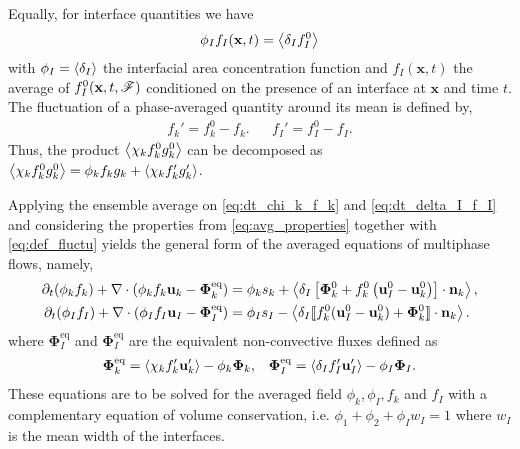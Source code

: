 Equally, for interface quantities we have 
\begin{equation}
    \phi_I f_I (\textbf{x},t) = \left<\delta_I f_I^0\right>
\end{equation}
with $\phi_I = \left<\delta_I\right>$ the interfacial area concentration function and $f_I(\textbf{x},t)$ the average of $f^0_I(\textbf{x},t,\mathscr{F})$ conditioned on the presence of an interface at $\textbf{x}$ and time $t$. 
The fluctuation of a phase-averaged quantity around its mean is defined by,
\begin{align}
    f_k' = f_k^0 - f_k.
    && f_I' = f_I^0 - f_I.
    \label{eq:def_fluctu}
\end{align}
Thus, the product $\left<\chi_k f^0_kg^0_k\right>$ can be decomposed as $\left<\chi_k f_k^0g_k^0\right>=\phi_k f_kg_k + \left<\chi_k f'_kg'_k\right>$. 


Applying the ensemble average on \ref{eq:dt_chi_k_f_k} and \ref{eq:dt_delta_I_f_I} and considering the properties from \ref{eq:avg_properties} together with \ref{eq:def_fluctu} yields the general form of the averaged equations of multiphase flows, namely,
\begin{align}
    \partial_t (\phi_k f_k)
    +\mathbf{\nabla}\cdot (\phi_k f_k \textbf{u}_k - \mathbf{\Phi}_k^\text{eq})
    &= 
    \phi_k s_k
    + \left<\delta_I\left[
        \mathbf{\Phi}_k^0
        + f_k^0
        \left(
            \textbf{u}_I^0
            - \textbf{u}_k^0
        \right)
    \right]
    \cdot \textbf{n}_k\right> ,
    \label{eq:avg_dt_chi_f}\\
    \partial_t (\phi_I f_I)
    +\mathbf{\nabla}\cdot (\phi_I f_I \textbf{u}_I- \mathbf{\Phi}_{I}^\text{eq})
    &= 
    \phi_I s_I
    - \left<\delta_I 
    \llbracket 
    f_k^0 (\textbf{u}_I^0 - \textbf{u}_k^0)
    + \mathbf{\Phi}_k^0
     \rrbracket \cdot \textbf{n}_k 
     \right>.
    \label{eq:avg_dt_delta_f}
\end{align}
where $\mathbf{\Phi}_{I}^\text{eq}$ and $\mathbf{\Phi}_{I}^\text{eq}$ are the equivalent non-convective fluxes defined as 
\begin{align*}
    \mathbf{\Phi}_k^\text{eq}
    = \left<\chi_k f_k' \textbf{u}_k'\right>
    - \phi_k \bm\Phi_k,
    &&
    \mathbf{\Phi}_{I}^\text{eq}
    = \left<\delta_I f_I' \textbf{u}_I'\right>
    - \phi_I \bm\Phi_I. 
\end{align*}
These equations are to be solved for the averaged field $\phi_k,\phi_I,f_k$ and $f_I$ with a complementary equation of volume conservation, i.e. $\phi_1+\phi_2+\phi_I w_I = 1$ where $w_I$ is the mean width of the interfaces.
